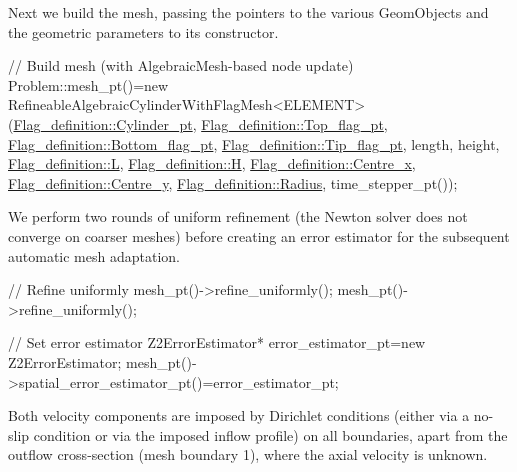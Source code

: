 Next we build the mesh, passing the pointers to the various {\ttfamily Geom\+Objects} and the geometric parameters to its constructor.


\begin{DoxyCodeInclude}
 \textcolor{comment}{// Build mesh (with AlgebraicMesh-based node update)}
 Problem::mesh\_pt()=\textcolor{keyword}{new} RefineableAlgebraicCylinderWithFlagMesh<ELEMENT>
  (\hyperlink{namespaceFlag__definition_a87051411606f6aa4518ace9ce66a4189}{Flag\_definition::Cylinder\_pt},
   \hyperlink{namespaceFlag__definition_af602ebeb0c40d05d00961af07bf3e842}{Flag\_definition::Top\_flag\_pt}, 
   \hyperlink{namespaceFlag__definition_adde5e58da47e90ef46e1183188281f2e}{Flag\_definition::Bottom\_flag\_pt}, 
   \hyperlink{namespaceFlag__definition_a17de6efd8447ee9c2bb5a1767084ecef}{Flag\_definition::Tip\_flag\_pt},
   length, height, 
   \hyperlink{namespaceFlag__definition_a94553533bee82260731a466182369a9d}{Flag\_definition::L},
   \hyperlink{namespaceFlag__definition_a6cdf33de1fe6f94832181664d7769af7}{Flag\_definition::H}, 
   \hyperlink{namespaceFlag__definition_a60f30c718c6c67504b05dca7832be8aa}{Flag\_definition::Centre\_x},
   \hyperlink{namespaceFlag__definition_a0024007edc2ad0ef647939aa6b06bde7}{Flag\_definition::Centre\_y},
   \hyperlink{namespaceFlag__definition_a921d8bd82b7b267651dea625a548dfcb}{Flag\_definition::Radius},
   time\_stepper\_pt());

\end{DoxyCodeInclude}


We perform two rounds of uniform refinement (the Newton solver does not converge on coarser meshes) before creating an error estimator for the subsequent automatic mesh adaptation.


\begin{DoxyCodeInclude}
 \textcolor{comment}{// Refine uniformly}
 mesh\_pt()->refine\_uniformly();
 mesh\_pt()->refine\_uniformly();

 \textcolor{comment}{// Set error estimator}
 Z2ErrorEstimator* error\_estimator\_pt=\textcolor{keyword}{new} Z2ErrorEstimator;
 mesh\_pt()->spatial\_error\_estimator\_pt()=error\_estimator\_pt;

\end{DoxyCodeInclude}


Both velocity components are imposed by Dirichlet conditions (either via a no-\/slip condition or via the imposed inflow profile) on all boundaries, apart from the outflow cross-\/section (mesh boundary 1), where the axial velocity is unknown.


